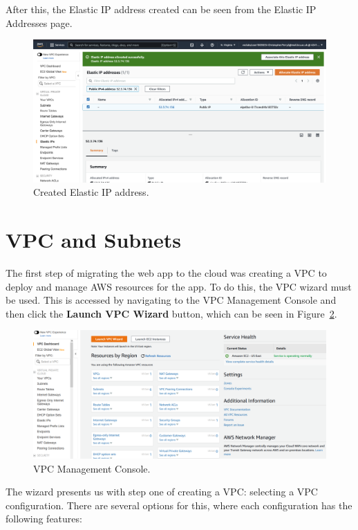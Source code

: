 After this, the Elastic IP address created can be seen from the Elastic IP Addresses page.

\begin{figure}[!htbp]
    \centering
    \includegraphics[width=150mm]{resources/vpc/elastic_ip_addresses}
    \caption{Created Elastic IP address.}
    \label{fig:elastic-ip-addresses}
\end{figure}

\clearpage
\section{VPC and Subnets}\label{sec:vpc-and-subnets}

The first step of migrating the web app to the cloud was creating a VPC to deploy and manage AWS resources for the app.
To do this, the VPC wizard must be used.
This is accessed by navigating to the VPC Management Console and then click the \textbf{Launch VPC Wizard} button, which
can be seen in Figure~\ref{fig:vpc-wizard}.

\begin{figure}[!htbp]
    \centering
    \includegraphics[width=150mm]{resources/vpc/vpc-dashboard}
    \caption{VPC Management Console.}
    \label{fig:vpc-wizard}
\end{figure}

The wizard presents us with step one of creating a VPC: selecting a VPC configuration.
There are several options for this, where each configuration has the following features:

